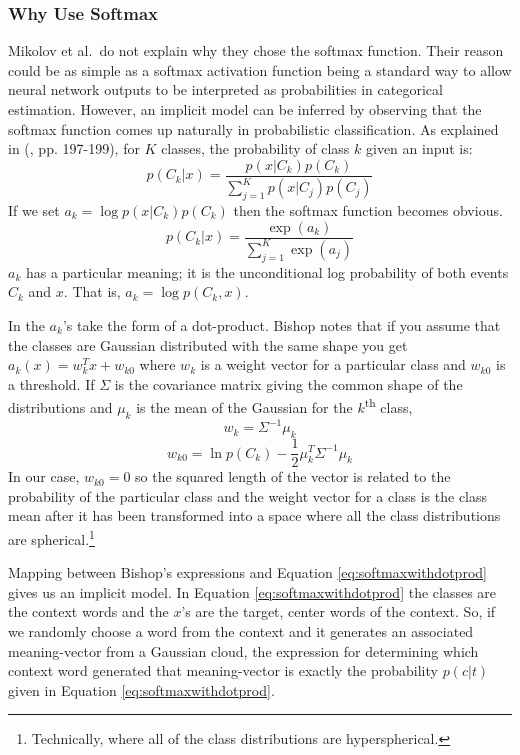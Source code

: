 \subsubsection{Why Use Softmax}

Mikolov et al.\ do not explain why they chose the softmax function. Their 
reason could be as simple as a softmax activation function being a standard 
way to allow neural network outputs to be interpreted as probabilities in 
categorical estimation. However, an implicit model can be inferred by observing 
that the softmax function comes up naturally in probabilistic classification. 
As explained in (\citealt{Bishop2006a}, pp. 197-199), for $K$ classes, the 
probability of class $k$ given an input is:
%
\[
 p(C_k | x) = \frac{p(x | C_k) p(C_k)}{\sum_{j=1}^{K} p(x | C_j)p(C_j)}
\]
If we set $a_k = \log p(x | C_k) p(C_k)$ then the softmax function becomes 
obvious.
%
\[
 p(C_k | x) = \frac{ \exp(a_k) }{ \sum_{j=1}^{K} \exp(a_j)}
\]
$a_k$ has a particular meaning; it is the unconditional log probability of both 
events $C_k$ and $x$. That is, $a_k=\log p(C_k, x)$.

In \modelname{} the $a_k$'s take the form of a dot-product. Bishop notes that if 
you assume that the classes are Gaussian distributed with the same shape you get 
$a_k(x) = w_k^T x + w_{k0}$ where $w_k$ is a weight vector for a particular 
class and $w_{k0}$ is a threshold. If $\Sigma$ is the covariance matrix giving 
the common shape of the distributions and $\mu_k$ is the mean of the Gaussian 
for the $k$\textsuperscript{th} class,
%
\[
 w_k = \Sigma^{-1}\mu_k
\]
\[
 w_{k0} = \ln p(C_k)-\frac{1}{2}\mu_k^T\Sigma^{-1}\mu_k
\]
%
In our case, $w_{k0} = 0$ so the squared length of the vector is related to 
the probability of the particular class and the weight vector for a class is
the class mean after it has been transformed into a space where all 
the class distributions are spherical.\footnote{Technically, where all of the
class distributions are hyperspherical.}

Mapping between Bishop's expressions and Equation \ref{eq:softmaxwithdotprod} 
gives us an implicit model. In Equation \ref{eq:softmaxwithdotprod} the classes 
are the context words and the $x$'s are the target, center words of the context.
So, if we randomly choose a word from the context and it generates an 
associated meaning-vector from a Gaussian cloud, the expression for determining
which context word generated that meaning-vector is exactly the probability
$p(c|t)$ given in Equation \ref{eq:softmaxwithdotprod}.


